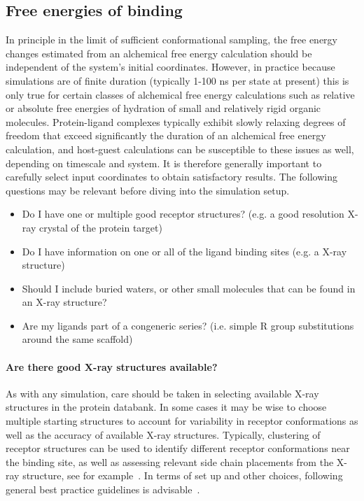 \documentclass[9pt,bestpractices]{livecoms}
\begin{document}
\subsection{Free energies of binding}
\label{subsec:binding}
In principle in the limit of sufficient conformational sampling, the free energy changes estimated from an alchemical free energy calculation should be independent of the system's initial coordinates. However, in practice because simulations are of finite duration (typically 1-100 ns per state at present) this is only true for certain classes of alchemical free energy calculations such as relative or absolute free energies of hydration of small and relatively rigid organic molecules. Protein-ligand complexes typically exhibit slowly relaxing degrees of freedom that exceed significantly the duration of an alchemical free energy calculation, and host-guest calculations can be susceptible to these issues as well, depending on timescale and system. It is therefore generally important to carefully select input coordinates to obtain satisfactory results. 
The following questions may be relevant before diving into the simulation setup.
% 
\begin{itemize}
    \item Do I have one or multiple good receptor structures? (e.g. a good resolution X-ray crystal of the protein target)
    \item Do I have information on one or all of the ligand binding sites (e.g. a X-ray structure)
    \item Should I include buried waters, or other small molecules that can be found in an X-ray structure?
    \item Are my ligands part of a congeneric series? (i.e. simple R group substitutions around the same scaffold)
    \end{itemize}
%
\paragraph{Are there good X-ray structures available?}
As with any simulation, care should be taken in selecting available X-ray structures in the protein databank. In some cases it may be wise to choose multiple starting structures to account for variability in receptor conformations as well as the accuracy of available X-ray structures. Typically, clustering of receptor structures can be used to identify different receptor conformations near the binding site, as well as assessing relevant side chain placements from the X-ray structure, see for example~\cite{mey2016blinded}. In terms of set up and other choices, following general best practice guidelines is advisable~\cite{braun2018best}.
\end{document}
